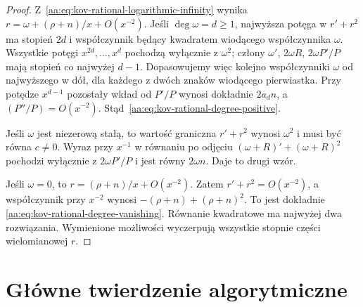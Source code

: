 \begin{proof}
Z~\eqref{aa:eq:kov-rational-logarithmic-infinity}
wynika
$r=\omega+(\rho+n)/x+O(x^{-2})$.
Jeśli $\deg\omega=d\ge1$,
najwyższa potęga w
$r'+r^2$ ma stopień $2d$
i współczynnik będący
kwadratem wiodącego
współczynnika $\omega$.
Wszystkie potęgi
$x^{2d},\ldots,x^d$
pochodzą wyłącznie z
$\omega^2$; człony
$\omega'$, $2\omega R$,
$2\omega P'/P$ mają stopień
co najwyżej $d-1$.
Dopasowujemy więc kolejno
współczynniki $\omega$
od najwyższego w dół,
dla każdego z dwóch
znaków wiodącego pierwiastka.
Przy potędze $x^{d-1}$
pozostały wkład od $P'/P$
wynosi dokładnie $2a_dn$,
a $(P''/P)=O(x^{-2})$.
Stąd~\eqref{aa:eq:kov-rational-degree-positive}.

Jeśli $\omega$ jest niezerową
stałą, to wartość graniczna
$r'+r^2$ wynosi $\omega^2$
i musi być równa $c\ne0$.
Wyraz przy $x^{-1}$ w
równaniu po odjęciu
$(\omega+R)'+(\omega+R)^2$
pochodzi wyłącznie z
$2\omega P'/P$ i jest
równy $2\omega n$.
Daje to drugi wzór.

Jeśli $\omega=0$,
to $r=(\rho+n)/x+O(x^{-2})$.
Zatem $r'+r^2=O(x^{-2})$,
a współczynnik przy $x^{-2}$
wynosi
$-(\rho+n)+(\rho+n)^2$.
To jest dokładnie
\eqref{aa:eq:kov-rational-degree-vanishing}.
Równanie kwadratowe
ma najwyżej dwa rozwiązania.
Wymienione możliwości
wyczerpują wszystkie
stopnie części wielomianowej $r$.
\end{proof}

\section{Główne twierdzenie algorytmiczne}

